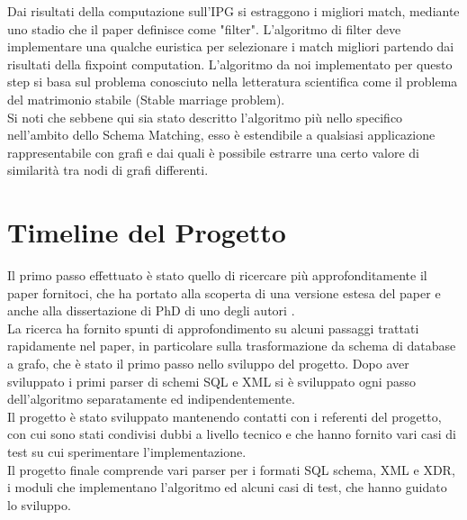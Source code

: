 \documentclass{article}
\begin{document}
Dai risultati della computazione sull’IPG si estraggono i migliori match, mediante uno stadio che il paper definisce come "filter". L'algoritmo di filter deve implementare una qualche euristica per selezionare i match migliori partendo dai risultati della fixpoint computation. L'algoritmo da noi implementato per questo step si basa sul problema conosciuto nella letteratura scientifica come il problema del matrimonio stabile (Stable marriage problem).\\

Si noti che sebbene qui sia stato descritto l'algoritmo più nello specifico nell'ambito dello Schema Matching, esso è estendibile a qualsiasi applicazione rappresentabile con grafi e dai quali è possibile estrarre una certo valore di similarità tra nodi di grafi differenti. \\


\section{Timeline del Progetto}

Il primo passo effettuato è stato quello di ricercare più approfonditamente il paper fornitoci, che ha portato alla scoperta di una versione estesa del paper \cite{sfpaper_ext} e anche alla dissertazione di PhD di uno degli autori \cite{generic_model_man}.\\

La ricerca ha fornito spunti di approfondimento su alcuni passaggi trattati rapidamente nel paper, in particolare sulla trasformazione da schema di database a grafo, che è stato il primo passo nello sviluppo del progetto.
Dopo aver sviluppato i primi parser di schemi SQL e XML si è sviluppato ogni passo dell’algoritmo separatamente ed indipendentemente.\\

Il progetto è stato sviluppato mantenendo contatti con i referenti del progetto, con cui sono stati condivisi dubbi a livello tecnico e che hanno fornito vari casi di test su cui sperimentare l’implementazione.\\

Il progetto finale comprende vari parser per i formati SQL schema, XML e XDR, i moduli che implementano l’algoritmo ed alcuni casi di test, che hanno guidato lo sviluppo.\\
\end{document}
